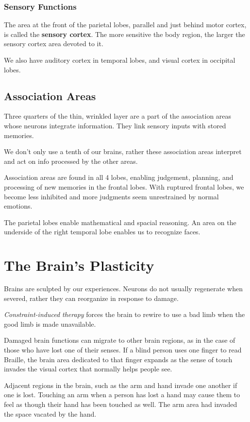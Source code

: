 \documentclass[12pt]{article}
\begin{document}
\subsubsection*{Sensory Functions}
The area at the front of the parietal lobes, parallel and just behind motor cortex, is called the \textbf{sensory cortex}. The more sensitive the body region, the larger the sensory cortex area devoted to it. 

We also have auditory cortex in temporal lobes, and visual cortex in occipital lobes. 

\subsection*{Association Areas}
Three quarters of the thin, wrinkled layer are a part of the association areas whose neurons integrate information. They link sensory inputs with stored memories.

We don't only use a tenth of our brains, rather these association areas interpret and act on info processed by the other areas.

Association areas are found in all 4 lobes, enabling judgement, planning, and processing of new memories in the frontal lobes. With ruptured frontal lobes, we become less inhibited and more judgments seem unrestrained by normal emotions.

The parietal lobes enable mathematical and spacial reasoning. An area on the underside of the right temporal lobe enables us to recognize faces. 

\section*{The Brain's Plasticity}
Brains are sculpted by our experiences. Neurons do not usually regenerate when severed, rather they can reorganize in response to damage.

\textit{Constraint-induced therapy} forces the brain to rewire to use a bad limb when the good limb is made unavailable.

Damaged brain functions can migrate to other brain regions, as in the case of those who have lost one of their senses. If a blind person uses one finger to read Braille, the brain area dedicated to that finger expands as the sense of touch invades the visual cortex that normally helps people see. 

Adjacent regions in the brain, such as the arm and hand invade one another if one is lost. Touching an arm when a person has lost a hand may cause them to feel as though their hand has been touched as well. The arm area had invaded the space vacated by the hand.
\end{document}
